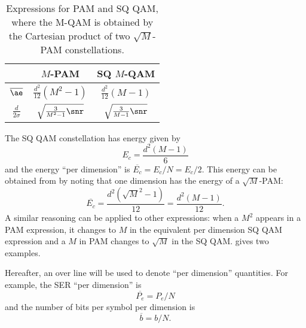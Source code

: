 	
\begin{table}
\begin{center}	
	\caption{Expressions for PAM and SQ QAM, where the M-QAM is obtained by the Cartesian product of two $\sqrt{M}$-PAM constellations.\label{tab:pamqam}}
\begin{tabular}{|c|c|c|}
\hline
& $M$-PAM & SQ $M$-QAM \\ \hline
$\overline{\ae}$ & $\frac{d^2}{12}(M^2 -1)$ & $\frac{d^2}{12}(M -1)$ \\ \hline
$ \frac{d}{2 \sigma}$ & $\sqrt{\frac{3}{M^2-1} \snr}$ & $\sqrt{\frac{3}{M-1} \snr}$ \\ \hline
\end{tabular}
\end{center}
\end{table}

The SQ QAM constellation has energy given by
\[
E_c = \frac{d^2 (M-1)}{6}
\]
and the energy ``per dimension'' is $\overline {E_c} = E_c / N = E_c/2$. This energy can be obtained from  by noting that one dimension has the energy of a $\sqrt{M}$-PAM:
\[
\overline{E_c} = \frac{d^2 (\sqrt{M}^2-1)}{12} = \frac{d^2 (M-1)}{12}. 
\]
A similar reasoning can be applied to other expressions: when a $M^2$ appears in a PAM expression, it changes to $M$ in the equivalent per dimension SQ QAM expression and a $M$ in PAM changes to $\sqrt{M}$ in the SQ QAM.  gives two examples.

Hereafter, an over line will be used to denote ``per dimension'' quantities. For example, the SER ``per dimension'' is
\[
\overline{P_e} = P_e / N 
\]
and the number of bits per symbol per dimension is
\[
\overline{b} = b/N.
\]



